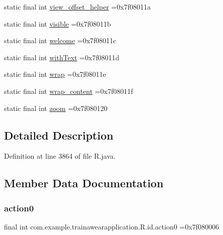 \begin{DoxyCompactItemize}
\item 
static final int \mbox{\hyperlink{classcom_1_1example_1_1trainawearapplication_1_1_r_1_1id_a10f335198e8398033f8f102bb31cace2}{view\+\_\+offset\+\_\+helper}} =0x7f08011a
\item 
static final int \mbox{\hyperlink{classcom_1_1example_1_1trainawearapplication_1_1_r_1_1id_a935bdaf20a266bda5c6533467a6bceed}{visible}} =0x7f08011b
\item 
static final int \mbox{\hyperlink{classcom_1_1example_1_1trainawearapplication_1_1_r_1_1id_a5a2086d9f997358f69c42b0ec34d9420}{welcome}} =0x7f08011c
\item 
static final int \mbox{\hyperlink{classcom_1_1example_1_1trainawearapplication_1_1_r_1_1id_af0cbdc1ecaa424508b0adba2ac184a6e}{with\+Text}} =0x7f08011d
\item 
static final int \mbox{\hyperlink{classcom_1_1example_1_1trainawearapplication_1_1_r_1_1id_a44c96738ce8a6f2d05c867f23472d5a2}{wrap}} =0x7f08011e
\item 
static final int \mbox{\hyperlink{classcom_1_1example_1_1trainawearapplication_1_1_r_1_1id_a94e3292068723259badfe3bc83346edc}{wrap\+\_\+content}} =0x7f08011f
\item 
static final int \mbox{\hyperlink{classcom_1_1example_1_1trainawearapplication_1_1_r_1_1id_a838c0b7d254c3014a422248b4721b39e}{zoom}} =0x7f080120
\end{DoxyCompactItemize}


\subsection{Detailed Description}


Definition at line 3864 of file R.\+java.



\subsection{Member Data Documentation}
\mbox{\label{classcom_1_1example_1_1trainawearapplication_1_1_r_1_1id_a6c80202eeccc7e6ceab24d9e82509bb9}} 
\subsubsection{\texorpdfstring{action0}{action0}}
{\footnotesize\ttfamily final int com.\+example.\+trainawearapplication.\+R.\+id.\+action0 =0x7f080006\hspace{0.3cm}{\ttfamily [static]}}



